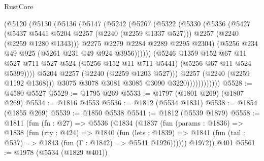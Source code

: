 \begin{lexlean}{RustCore}
\begin{coremodule}
                            (@5120
                              (@5130
                                (@5136
                                  (@5147
                                    (@5242
                                      (@5267
                                        (@5322
                                          (@5330
                                            (@5336
                                              (@5427
                                                (@5437 @5441 @5204 @2257 (@2240 (@2259 @1337 @527)))
                                                @2257
                                                (@2240 (@2259 @1280 @1343)))
                                              @2275
                                              @2279
                                              @2284
                                              @2289
                                              @2295
                                              @2304)
                                            (@5256 @234 @49 @925 (@5261 @231 @49 @924 @3956))))))
                                    (@5246
                                      @1359
                                      @152
                                      @67
                                      @11
                                      @527
                                      @711
                                      @527
                                      @524
                                      (@5256 @152 @11 @711 @5441)
                                      (@5256 @67 @11 @524 @5399))))
                                @5204
                                @2257
                                (@2240 (@2259 @1203 @527)))
                              @2257
                              (@2240 (@2259 @1192 @1368)))
                            @3075
                            @3078
                            @3081
                            @3085
                            @3090
                            @3220))))))))))))
@5528 := @4580 @5527
@5529 := @1795 @269
@5533 := @1797 (@1801 @269) (@1807 @269)
@5534 := @1816 @4553
@5536 := @1812 (@5534 @1831)
@5538 := @1854 (@1855 @269)
@5539 := @1850 @5538
@5541 := @1812 (@5539 @1879)
@5558 := @1811
    (fun (fn : @27) =>
    @5536
      (@1834
        (@1837
          (fun (params : @1836) =>
          @1838
            (fun (rty : @424) =>
            @1840
              (fun (lets : @1839) =>
              @1841 (fun (tail : @537) => @1843 (fun (Γ : @1842) => @5541 @1926))))))
        @1972))
    @401
@5561 := @1978 (@5534 (@1829 @401))

\end{coremodule}
\end{lexlean}

